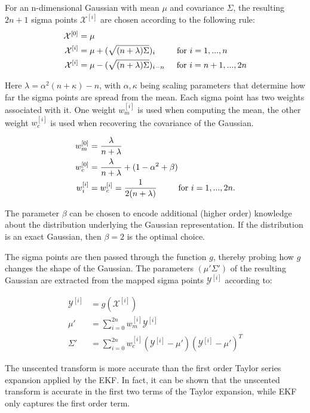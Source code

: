 \documentclass[14pt,letterpaper]{article}
\theoremstyle{definition}
\begin{document}
For an n-dimensional Gaussian with mean $\mu$ and covariance $\Sigma$, the resulting $2n+1$ sigma points $\mathcal{X}^{ [i] }$ are chosen according to the following rule:
\begin{align}
  \mathcal{X}^{ [0] } &= \mu \\
  \mathcal{X}^{ [i] } &= \mu + (\sqrt{(n + \lambda) \Sigma})_{i} \hspace{9mm} \text{for } i=1,...,n \\
  \mathcal{X}^{ [i] } &= \mu - (\sqrt{(n + \lambda) \Sigma})_{i-n} \hspace{5mm} \text{for } i=n+1,...,2n
\end{align}

Here $\lambda = \alpha^2 (n+ \kappa)-n$, with $\alpha, \kappa$ being scaling parameters that determine how far the sigma points are spread from the mean.
Each sigma point has two weights associated with it.
One weight $w_m^{ [i] }$ is used when computing the mean, the other weight $w_c^{ [i] }$ is used when recovering the covariance of the Gaussian.

\begin{align}
  w_m^{ [0] } &= \frac{\lambda}{n+\lambda} \\
  w_c^{ [0] } &= \frac{\lambda}{n+\lambda} + (1 - \alpha^2 + \beta) \\
  w_i^{ [i] } &= w_c^{ [i] } = \frac{1}{2(n+\lambda)} \hspace{9mm} \text{for } i=1,...,2n.
\end{align}

The parameter $\beta$ can be chosen to encode additional (higher order) knowledge about the distribution underlying the Gaussian representation.
If the distribution is an exact Gaussian, then $\beta=2$ is the optimal choice.

The sigma points are then passed through the function $g$, thereby probing how $g$ changes the shape of the Gaussian.
The parameters $(\mu' \Sigma')$ of the resulting Gaussian are extracted from the mapped sigma points $\mathcal{Y}^{ [i] }$ according to:

\begin{align}
  \mathcal{Y}^{ [i] } &= g(\mathcal{X}^{ [i] }) \\
  \mu' &= \sum_{i=0}^{2n}{w_m^{ [i] } \mathcal{Y}^{ [i] }} \\
  \Sigma' &= \sum_{i=0}^{2n}{w_c^{ [i] }(\mathcal{Y}^{ [i] } - \mu')(\mathcal{Y}^{ [i] } - \mu')^T}
\end{align}

The unscented transform is more accurate than the first order Taylor series expansion applied by the EKF.
In fact, it can be shown that the unscented transform is accurate in the first two terms of the Taylor expansion, while EKF only captures the first order term.
\end{document}
